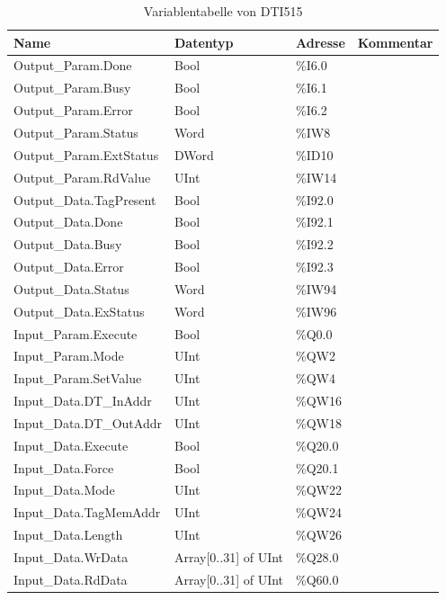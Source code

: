\begin{table}[h!]
	\centering
	\renewcommand{\arraystretch}{1.0} %
	\tiny
	\begin{tabular}{|l|l|l|l|}
		\hline
		\textbf{Name} & \textbf{Datentyp} & \textbf{Adresse} & \textbf{Kommentar} \\ \hline
		Output\_Param.Done & Bool & \%I6.0 & \\ \hline
		Output\_Param.Busy & Bool & \%I6.1 & \\ \hline
		Output\_Param.Error & Bool & \%I6.2 & \\ \hline
		Output\_Param.Status & Word & \%IW8 & \\ \hline
		Output\_Param.ExtStatus & DWord & \%ID10 & \\ \hline
		Output\_Param.RdValue & UInt & \%IW14 & \\ \hline
		Output\_Data.TagPresent & Bool & \%I92.0 & \\ \hline
		Output\_Data.Done & Bool & \%I92.1 & \\ \hline
		Output\_Data.Busy & Bool & \%I92.2 & \\ \hline
		Output\_Data.Error & Bool & \%I92.3 & \\ \hline
		Output\_Data.Status & Word & \%IW94 & \\ \hline
		Output\_Data.ExStatus & Word & \%IW96 & \\ \hline
		Input\_Param.Execute & Bool & \%Q0.0 & \\ \hline
		Input\_Param.Mode & UInt & \%QW2 & \\ \hline
		Input\_Param.SetValue & UInt & \%QW4 & \\ \hline
		Input\_Data.DT\_InAddr & UInt & \%QW16 & \\ \hline
		Input\_Data.DT\_OutAddr & UInt & \%QW18 & \\ \hline
		Input\_Data.Execute & Bool & \%Q20.0 & \\ \hline
		Input\_Data.Force & Bool & \%Q20.1 & \\ \hline
		Input\_Data.Mode & UInt & \%QW22 & \\ \hline
		Input\_Data.TagMemAddr & UInt & \%QW24 & \\ \hline
		Input\_Data.Length & UInt & \%QW26 & \\ \hline
		Input\_Data.WrData & Array[0..31] of UInt & \%Q28.0 & \\ \hline
		Input\_Data.RdData & Array[0..31] of UInt & \%Q60.0 & \\ \hline
	\end{tabular}
	\caption{Variablentabelle von DTI515}
	\label{tab:DTI515}
\end{table}

\clearpage



